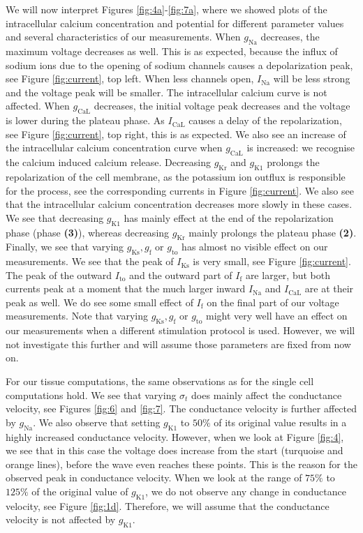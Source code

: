 \documentclass{article}
\begin{document}
We will now interpret Figures \ref{fig:4a}-\ref{fig:7a}, where we showed plots of the intracellular calcium concentration and potential for different parameter values and several characteristics of our measurements. When $g_{\mathrm{Na}}$ decreases, the maximum voltage decreases as well. This is as expected, because the influx of sodium ions due to the opening of sodium channels causes a depolarization peak, see Figure \ref{fig:current}, top left. When less channels open, $I_\mathrm{Na}$ will be less strong and the voltage peak will be smaller. The intracellular calcium curve is not affected. When $g_{\mathrm{CaL}}$ decreases, the initial voltage peak decreases and the voltage is lower during the plateau phase. As $I_\mathrm{CaL}$ causes a delay of the repolarization, see Figure \ref{fig:current}, top right, this is as expected. We also see an increase of the intracellular calcium concentration curve when $g_{\mathrm{CaL}}$ is increased: we recognise the calcium induced calcium release. Decreasing $g_{\mathrm{Kr}}$ and $g_{\mathrm{K1}}$ prolongs the repolarization of the cell membrane, as the potassium ion outflux is responsible for the process, see the corresponding currents in Figure \ref{fig:current}. We also see that the intracellular calcium concentration decreases more slowly in these cases. We see that decreasing $g_{\mathrm{K1}}$ has mainly effect at the end of the repolarization phase (phase \textbf{(3)}), whereas decreasing $g_{\mathrm{Kr}}$ mainly prolongs the plateau phase \textbf{(2)}. Finally, we see that varying $g_{\mathrm{Ks}}, g_{\mathrm{f}}$ or $g_{\mathrm{to}}$ has almost no visible effect on our measurements. We see that the peak of $I_{\mathrm{Ks}}$ is very small, see Figure \ref{fig:current}. The peak of the outward $I_{\mathrm{to}}$ and the outward part of $I_{\mathrm{f}}$ are larger, but both currents peak at a moment that the much larger inward ${I_\mathrm{Na}}$ and $I_{\mathrm{CaL}}$ are at their peak as well. We do see some small effect of $I_{\mathrm{f}}$ on the final part of our voltage measurements. Note that varying $g_{\mathrm{Ks}}, g_{\mathrm{f}}$ or $g_{\mathrm{to}}$ might very well have an effect on our measurements when a different stimulation protocol is used. However, we will not investigate this further and will assume those parameters are fixed from now on. 

For our tissue computations, the same observations as for the single cell computations hold. We see that varying $\sigma_t$ does mainly affect the conductance velocity, see Figures \ref{fig:6} and \ref{fig:7}. The conductance velocity is further affected by $g_{\mathrm{Na}}$. We also observe that setting $g_{\mathrm{K1}}$ to $50\%$ of its original value results in a highly increased conductance velocity. However, when we look at Figure \ref{fig:4}, we see that in this case the voltage does increase from the start (turquoise and orange lines), before the wave even reaches these points. This is the reason for the observed peak in conductance velocity. When we look at the range of $75\%$ to $125\%$ of the original value of $g_{\mathrm{K1}}$, we do not observe any change in conductance velocity, see Figure \ref{fig:1d}. Therefore, we will assume that the conductance velocity is not affected by $g_{\mathrm{K1}}$.
%
\end{document}
